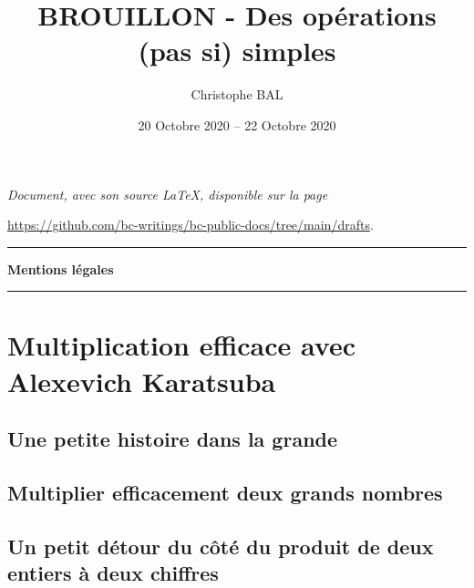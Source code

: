 \documentclass[12pt]{amsart}
\begin{document}
\title{BROUILLON - Des opérations (pas si) simples}
\author{Christophe BAL}
\date{20 Octobre 2020 -- 22 Octobre 2020}

\maketitle

\begin{center}
	\itshape
	Document, avec son source \LaTeX, disponible sur la page

	\url{https://github.com/bc-writings/bc-public-docs/tree/main/drafts}.
\end{center}


\bigskip


\begin{center}
	\hrule\vspace{.3em}
	{
		\fontsize{1.35em}{1em}\selectfont
		\textbf{Mentions \og légales \fg}
	}

	\vspace{0.45em}
	\doclicenseThis
	\hrule
\end{center}


\bigskip
\setcounter{tocdepth}{2}
\tableofcontents




\newpage

\section{Multiplication efficace avec Alexevich Karatsuba}

	\subsection{Une petite histoire dans la grande}
	


	\subsection{Multiplier efficacement deux grands nombres}
	


	\subsection{Un petit détour du côté du produit de deux entiers à deux chiffres}
	
	
	
\end{document}
